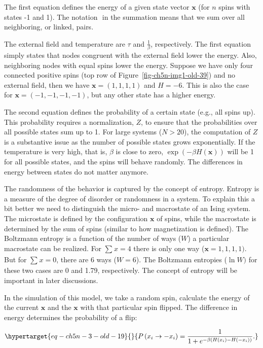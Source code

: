 \documentclass[
  a4paper,
  DIV=11,
  numbers=noendperiod,
  oneside]{scrreprt}
\begin{document}
The first equation defines the energy of a given state vector
\(\mathbf{x}\) (for \(n\) spins with states -1 and 1). The notation
\(< i,j >\) in the summation means that we sum over all neighboring, or
linked, pairs.

The external field and temperature are \(\tau\) and \(\frac{1}{\beta}\),
respectively. The first equation simply states that nodes congruent with
the external field lower the energy. Also, neighboring nodes with equal
spins lower the energy. Suppose we have only four connected positive
spins (top row of Figure~\ref{fig-ch5n-img1-old-39}) and no external
field, then we have \(\mathbf{x} = (1,1,1,1)\) and \(H = - 6\). This is
also the case for \(\mathbf{x} = ( - 1, - 1, - 1, - 1)\), but any other
state has a higher energy.

The second equation defines the probability of a certain state (e.g.,
all spins up). This probability requires a normalization, \(Z\), to
ensure that the probabilities over all possible states sum up to 1. For
large systems (\(N > 20\)), the computation of \(Z\) is a substantive
issue as the number of possible states grows exponentially. If the
temperature is very high, that is, \(\beta\) is close to zero,
\(\exp\left( - \beta H\left( \mathbf{x} \right) \right)\) will be 1 for
all possible states, and the spins will behave randomly. The differences
in energy between states do not matter anymore.

The randomness of the behavior is captured by the concept of entropy.
Entropy is a measure of the degree of disorder or randomness in a
system. To explain this a bit better we need to distinguish the micro-
and macrostate of an Ising system. The microstate is defined by the
configuration \(\mathbf{x}\) of spins, while the macrostate is
determined by the sum of spins (similar to how magnetization is
defined). The Boltzmann entropy is a function of the number of ways
(\(W\)) a particular macrostate can be realized. For \(\sum_{}^{}x = 4\)
there is only one way (\(\mathbf{x} = 1,1,1,1)\). But for
\(\sum_{}^{}x = 0\), there are 6 ways (\(W = 6\)). The Boltzmann
entropies (\(\ln W)\) for these two cases are 0 and 1.79, respectively.
The concept of entropy will be important in later discussions.

In the simulation of this model, we take a random spin, calculate the
energy of the current \(\mathbf{x}\) and the \(\mathbf{x}\) with that
particular spin flipped. The difference in energy determines the
probability of a flip:

\begin{equation}\protect\hypertarget{eq-ch5n-3-old-19}{}{
P\left( x_{i} \rightarrow - x_{i} \right) = \frac{1}{ 1 + e^{- \beta\left( H\left( x_{i} \right) - H\left( - x_{i} \right) \right)}}.}\label{eq-ch5n-3-old-19}\end{equation}
\end{document}

